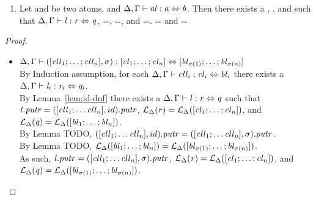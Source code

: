 \begin{lemma}
\begin{enumerate}
\item Let \Atom{} and \AtomAlt{} be two atoms, and $\Delta, \Gamma \vdash \mathit{al} : \mathit{a} \Leftrightarrow \mathit{b}$.  Then there exists a \Lens{}, \Regex{}, and \RegexAlt{} such that $\Delta, \Gamma \vdash \mathit{l} : \mathit{r} \Leftrightarrow \mathit{q}$, \PutRight{\Lens}=\PutRight{\AtomLens}, \LanguageOf{\Delta}{\Regex}=\LanguageOf{\Delta}{\Atom}, and \LanguageOf{\Delta}{\RegexAlt}=\LanguageOf{\Delta}{\AtomAlt}.  \LanguageOf{\Delta{}}{\Regex{}} = \LanguageOf{\Delta{}}{\Atom{}} and
\LanguageOf{\Delta{}}{\RegexAlt{}} = \LanguageOf{\Delta{}}{\AtomAlt{}}
\end{enumerate}
\begin{proof}
\begin{itemize}\leavevmode\\
\item $\Delta, \Gamma \vdash ([\mathit{cll}_1;\ldots;\mathit{cll}_n],\sigma) : [\mathit{cl}_1;\ldots;\mathit{cl}_n] \Leftrightarrow [\mathit{bl}_{\sigma(1)};\ldots;\mathit{bl}_{\sigma(n)}]$\\
By Induction assumption, for each $\Delta, \Gamma \vdash \mathit{cll}_i : \mathit{cl}_i \Leftrightarrow \mathit{bl}_i$ there exists a $\Delta, \Gamma \vdash \mathit{l}_i : \mathit{r}_i \Leftrightarrow \mathit{q}_i$.\\
By Lemma~\ref{lem:id-dnf} there exists a $\Delta, \Gamma \vdash \mathit{l} : \mathit{r} \Leftrightarrow \mathit{q}$ such that $\mathit{l}\mathit{.putr}=([\mathit{cll}_1;\ldots\mathit{cll}_n],id)\mathit{.putr}$,
$\mathcal{L}_{\Delta}(\mathit{r})=\mathcal{L}_{\Delta}([\mathit{cl}_1;\ldots;\mathit{cl}_n])$, and
$\mathcal{L}_{\Delta}(\mathit{q})=\mathcal{L}_{\Delta}([\mathit{bl}_1;\ldots;\mathit{bl}_n])$.\\
By Lemma TODO, $([\mathit{cll}_1;\ldots\mathit{cll}_n],id)\mathit{.putr}=([\mathit{cll}_1;\ldots\mathit{cll}_n],\sigma)\mathit{.putr}$.\\
By Lemma TODO, $\mathcal{L}_{\Delta}([\mathit{bl}_1;\ldots;\mathit{bl}_n])=\mathcal{L}_{\Delta}([\mathit{bl}_{\sigma(1)};\ldots;\mathit{bl}_{\sigma(n)}])$.\\
As such, $\mathit{l}\mathit{.putr}=([\mathit{cll}_1;\ldots\mathit{cll}_n],\sigma)\mathit{.putr}$,
$\mathcal{L}_{\Delta}(\mathit{r})=\mathcal{L}_{\Delta}([\mathit{cl}_1;\ldots;\mathit{cl}_n])$,
and $\mathcal{L}_{\Delta}(\mathit{q})=\mathcal{L}_{\Delta}([\mathit{bl}_{\sigma(1)};\ldots;\mathit{bl}_{\sigma(n)}])$.\\


\end{itemize}
\end{proof}
\end{lemma}

